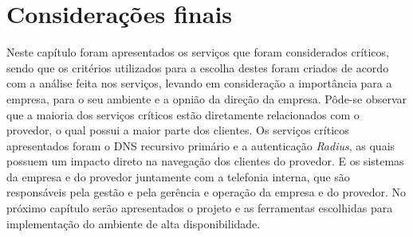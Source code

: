\section{Considerações finais}

Neste capítulo foram apresentados os serviços que foram considerados críticos, sendo que os critérios utilizados para a escolha destes foram 
criados de acordo com a análise feita nos serviços, levando em consideração a importância para a empresa, para o seu ambiente e a opnião da 
direção da empresa. Pôde-se observar que a maioria dos serviços críticos estão diretamente relacionados com o provedor, o qual possui a maior
parte dos clientes. Os serviços críticos apresentados foram o \ac{DNS} recursivo primário e a autenticação \textit{Radius}, as quais possuem
um impacto direto na navegação dos clientes do provedor. E os sistemas da empresa e do provedor juntamente com a telefonia interna, que 
são responsáveis pela gestão e pela gerência e operação da empresa e do provedor.
No próximo capítulo serão apresentados o projeto e as ferramentas escolhidas para implementação do ambiente de alta disponibilidade. 
